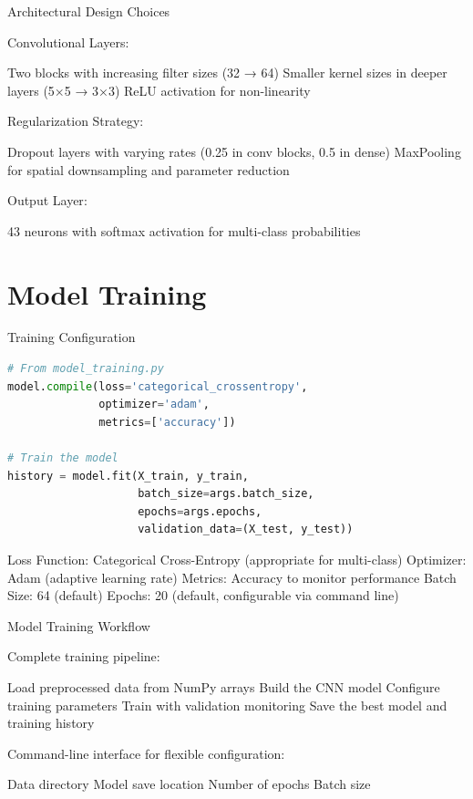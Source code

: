 \documentclass{beamer}
\begin{document}
\begin{frame}{Architectural Design Choices}
\begin{itemize}
    {Convolutional Layers}:
    \begin{itemize}
        Two blocks with increasing filter sizes (32 → 64)
        Smaller kernel sizes in deeper layers (5×5 → 3×3)
        ReLU activation for non-linearity
    \end{itemize}
    {Regularization Strategy}:
    \begin{itemize}
        Dropout layers with varying rates (0.25 in conv blocks, 0.5 in dense)
        MaxPooling for spatial downsampling and parameter reduction
    \end{itemize}
    {Output Layer}:
    \begin{itemize}
        43 neurons with softmax activation for multi-class probabilities
    \end{itemize}
\end{itemize}
\end{frame}

\section{Model Training}

\begin{frame}{Training Configuration}
\begin{lstlisting}[language=Python]
# From model_training.py
model.compile(loss='categorical_crossentropy', 
              optimizer='adam', 
              metrics=['accuracy'])

# Train the model
history = model.fit(X_train, y_train, 
                    batch_size=args.batch_size, 
                    epochs=args.epochs, 
                    validation_data=(X_test, y_test))
\end{lstlisting}

\begin{itemize}
{Loss Function}: Categorical Cross-Entropy (appropriate for multi-class)
{Optimizer}: Adam (adaptive learning rate)
{Metrics}: Accuracy to monitor performance
{Batch Size}: 64 (default)
{Epochs}: 20 (default, configurable via command line)
\end{itemize}
\end{frame}

\begin{frame}{Model Training Workflow}
\begin{itemize}
    Complete training pipeline:
    \begin{enumerate}
        Load preprocessed data from NumPy arrays
        Build the CNN model
        Configure training parameters
        Train with validation monitoring
        Save the best model and training history
    \end{enumerate}
    Command-line interface for flexible configuration:
    \begin{itemize}
        Data directory
        Model save location
        Number of epochs
        Batch size
    \end{itemize}
\end{itemize}
\end{frame}
\end{document}
